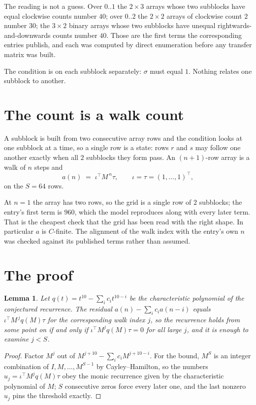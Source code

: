 \documentclass[11pt,a4paper]{article}
\theoremstyle{plain}
\newtheorem{lemma}[theorem]{Lemma}
\theoremstyle{definition}
\begin{document}
The reading is not a guess. Over $0..1$ the $2\times3$ arrays whose two subblocks have equal
clockwise counts number $40$; over $0..2$ the $2\times2$ arrays of clockwise count $2$ number
$30$; the $3\times2$ binary arrays whose two subblocks have unequal rightwards-and-downwards
counts number $40$. Those are the first terms the corresponding entries publish, and each was
computed by direct enumeration before any transfer matrix was built.

The condition is on each subblock separately: $\sigma$ must equal $1$. Nothing
relates one subblock to another.

\section{The count is a walk count}

A subblock is built from two consecutive array rows and the condition looks
at one subblock at a time, so a single row is a state: rows $r$ and $s$ may follow one another
exactly when all $2$ subblocks they form pass. An $(n+1)$-row array is a walk of $n$ steps and
\[
a(n)\;=\;\iota^{\!\top}M^{\,n}\tau,\qquad\iota=\tau=(1,\dots,1)^{\!\top},
\]
on the $S=64$ rows.

At $n=1$ the array has two rows, so the grid is a single row of $2$
subblocks; the entry's first term is $960$, which the model
reproduces along with every later term. That is the cheapest check that the grid has been read
with the right shape.
In particular $a$ is $C$-finite. The alignment of the walk index with the entry's own $n$ was
checked against its published terms rather than assumed.

\section{The proof}

\begin{lemma}\label{lem:crit}
Let $q(t)=t^{10}-\sum_i c_it^{10-i}$ be the characteristic polynomial of the
conjectured recurrence. The residual $a(n)-\sum_ic_ia(n-i)$ equals
$\iota^{\!\top}M^{\,j}q(M)\tau$ for the corresponding walk index $j$, so the recurrence
holds from some point on if and only if $\iota^{\!\top}M^{j}q(M)\tau=0$ for all large $j$,
and it is enough to examine $j<S$.
\end{lemma}

\begin{proof}
Factor $M^{j}$ out of $M^{j+10}-\sum_ic_iM^{j+10-i}$. For the bound, $M^{S}$
is an integer combination of $I,M,\dots,M^{S-1}$ by Cayley--Hamilton, so the numbers
$u_j=\iota^{\!\top}M^{j}q(M)\tau$ obey the monic recurrence given by the characteristic
polynomial of $M$; $S$ consecutive zeros force every later one, and the last nonzero $u_j$
pins the threshold exactly.
\end{proof}
\end{document}

